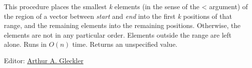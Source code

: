 \begin{entry}{%
  }

This procedure places the smallest \emph{k} elements (in the sense of
the \textless{} argument) of the region of a vector between
\emph{start} and \emph{end} into the first \emph{k} positions of that
range, and the remaining elements into the remaining
positions. Otherwise, the elements are not in any particular
order. Elements outside the range are left alone. Runs in $O(n)$
time. Returns an unspecified value.
\end{entry}

Editor:
\href{mailto:srfi-editors\%20at\%20srfi\%20dot\%20schemers\%20dot\%20org}{Arthur
A. Gleckler}

